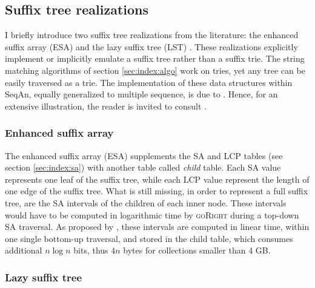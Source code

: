 
\subsection{Suffix tree realizations}
\label{sec:index:stree}

I briefly introduce two suffix tree realizations from the literature: the enhanced suffix array (ESA) \citep{Abouelhoda2004} and the lazy suffix tree (LST) \citep{Giegerich2003}.
These realizations explicitly implement or implicitly emulate a suffix tree rather than a suffix trie.
The string matching algorithms of section \ref{sec:index:algo} work on tries, yet any tree can be easily traversed as a trie.
The implementation of these data structures within SeqAn, equally generalized to multiple sequence, is due to \citeauthor{Weese2013}.
Hence, for an extensive illustration, the reader is invited to consult \citep{Weese2013}.

\subsubsection{Enhanced suffix array}
\label{sec:index:esa}

The enhanced suffix array (ESA) \citep{Abouelhoda2004} supplements the SA and LCP tables (see section \ref{sec:index:sa}) with another table called \emph{child} table.
Each SA value represents one leaf of the suffix tree, while each LCP value represent the length of one edge of the suffix tree.
What is still missing, in order to represent a full suffix tree, are the SA intervals of the children of each inner node.
These intervals would have to be computed in logarithmic time by \textsc{goRight} during a top-down SA traversal.
As proposed by \cite{Abouelhoda2004}, these intervals are computed in linear time, within one single bottom-up traversal, and stored in the child table, which consumes additional $n \log n$ bits, thus $4n$ bytes for collections smaller than 4 GB.

\subsubsection{Lazy suffix tree}
\label{sec:index:lst}

